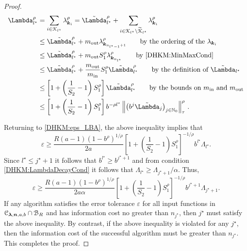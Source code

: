 \documentclass[USenglish]{article}
\theoremstyle{dgthm}
\theoremstyle{dgthm}
\theoremstyle{dgthm}
\theoremstyle{dgthm}
\theoremstyle{dgdef}
\theoremstyle{definition}
\newcommand{\DHKMtcalK}{\widetilde{\calK}}
\newcommand{\DHKMinc}{\textup{in}}
\newcommand{\DHKMout}{\textup{out}}
\newcommand{\DHKMnorm}[2][{}]{\ensuremath{\left \lVert #2 \right \rVert}_{#1}}
\newcommand{\DHKMtLambda}{\Tilde{\Lambda}}
\begin{document}
\begin{proof}
\begin{align*}
    \Lambda_{l^\star}^\rho & = \sum_{i \in \calK_{l^\star}} \lambda_{\bsk_i}^{\rho} =  \DHKMtLambda_{l^\star}^\rho + \sum_{i \in \calK_{l^\star} \setminus \DHKMtcalK_{l^\star}} \lambda_{\bsk_i}^{\rho}
    \\
    &\le  \DHKMtLambda_{l^\star}^\rho + m_{\DHKMout} \lambda_{\bsk_{n_{l^\star -1}+1}}^\rho \qquad \text{by the ordering of the } \lambda_{\bsk_i}\\
    &\le  \DHKMtLambda_{l^\star}^\rho + m_{\DHKMout} S_1^\rho \lambda_{\bsk_{n_{l^\star}}}^\rho \qquad \text{by \eqref{DHKM:MinMaxCond}}\\
    & \le \DHKMtLambda_{l^\star}^\rho + \frac{m_{\DHKMout}}{m_{\DHKMinc}} S_1^\rho \DHKMtLambda_{l^\star}^\rho \qquad \text{by the definition of } \DHKMtLambda_{l^\star}\\
    & \le \left[1 + \left(\frac 1 {S_2} -1 \right) S_1^\rho \right] \DHKMtLambda_{l^\star}^\rho \qquad \text{by the bounds on } m_{\DHKMinc} \text{ and } m_{\DHKMout} 
    \\
    & \le \left[1 + \left(\frac 1 {S_2} -1 \right) S_1^\rho \right] b^{-\rho l^\star} \DHKMnorm[\tau]{\bigl(b^{j} \DHKMtLambda_j \bigr)_{j \in \N_0}}^\rho\, .
\end{align*}

Returning to \eqref{DHKM:eps_LBA}, the above inequality  implies that
\begin{equation*}
    \varepsilon 
\ge  \frac{R(a-1)(1 - b^\rho)^{1/\rho}}{2a} \left[1 + \left(\frac 1 {S_2} -1 \right) S_1^\rho \right]^{-1/\rho} b^{l^\star} \Lambda_{l^\star}.
\end{equation*}
Since $l^\star \le j^{\star}+1$ it follows that $ b^{l^\star} \ge b^{j^\star+1}$ and from condition \eqref{DHKM:LambdaDecayCond} it follows that $\Lambda_{l^\star} \ge \Lambda_{j^\star+1}/\alpha$.  Thus,
\begin{equation*}
    \varepsilon 
\ge  \frac{R(a-1)(1 - b^\rho)^{1/\rho}}{2a\alpha} \left[1 + \left(\frac 1 {S_2} -1 \right) S_1^\rho \right]^{-1/\rho} b^{j^\star+1} \Lambda_{j^\star+1}.
\end{equation*}
If any algorithm satisfies the error tolerance $\varepsilon$ for all input functions in ${\mathcal{C}}_{\boldsymbol{\lambda},{\boldsymbol{n}},a,b} \cap {\mathcal{B}}_R$ and has information cost no greater than $n_{j^\star}$, then $j^\star$ must satisfy the above inequality.  By contrast, if the above inequality is violated for any $j^\star$, then the information cost of the successful algorithm must be greater than $n_{j^\star}$.  This completes the proof.
\end{proof} \
\end{document}
